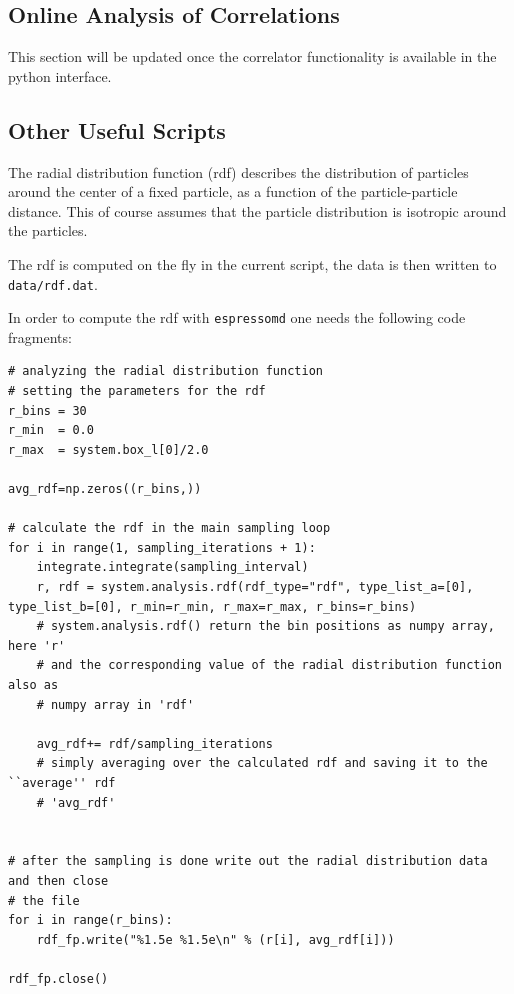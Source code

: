\documentclass[
paper=a4,                       %
fontsize=11pt,                  %
twoside,                        %
footsepline,                    %
headsepline,                    %
headinclude=false,              %
footinclude=false,              %
pagesize,                       %
]{scrartcl}
\begin{document}
\newpage


\subsection{Online Analysis of Correlations}

\label{subsection:online_analysis}

This section will be updated once the correlator functionality is available in the
python interface.


\subsection{Other Useful Scripts}

\label{subsection:other_useful_scripts}
The radial distribution function (rdf) describes the distribution of particles around
the center of a fixed particle, as a function of the particle-particle distance. This of course assumes
that the particle distribution is isotropic around the particles.

The rdf is computed on the fly in the current script, the data is then written to
\texttt{data/rdf.dat}.

In order to compute the rdf with \texttt{espressomd} one needs the following code
fragments:
\begin{lstlisting}
# analyzing the radial distribution function
# setting the parameters for the rdf
r_bins = 30
r_min  = 0.0
r_max  = system.box_l[0]/2.0

avg_rdf=np.zeros((r_bins,))

# calculate the rdf in the main sampling loop
for i in range(1, sampling_iterations + 1):
    integrate.integrate(sampling_interval)
    r, rdf = system.analysis.rdf(rdf_type="rdf", type_list_a=[0], type_list_b=[0], r_min=r_min, r_max=r_max, r_bins=r_bins)
    # system.analysis.rdf() return the bin positions as numpy array, here 'r'
    # and the corresponding value of the radial distribution function also as
    # numpy array in 'rdf'

    avg_rdf+= rdf/sampling_iterations
    # simply averaging over the calculated rdf and saving it to the ``average'' rdf
    # 'avg_rdf'
    

# after the sampling is done write out the radial distribution data and then close
# the file
for i in range(r_bins):
    rdf_fp.write("%1.5e %1.5e\n" % (r[i], avg_rdf[i]))

rdf_fp.close()
\end{lstlisting}
\end{document}

